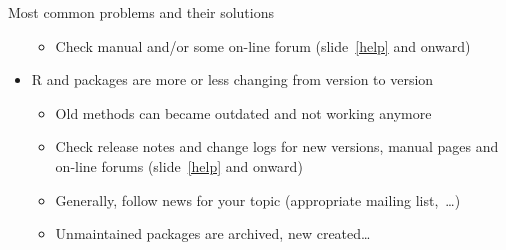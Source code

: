 \documentclass[compress, ucs, xelatex, 11pt, xcolor=svgnames, aspectratio=169,
	hyperref={
		bookmarks=true,
		unicode=true,
		colorlinks=true,
		pdftitle={Molecular data in R},
		plainpages=false,
		pdfauthor={Vojtech Zeisek},
		pdfsubject={Course about phylogeny and evolution in R},
		pdfcreator={XeLaTeX},
		pdfkeywords={R, evolution, phylogeny, molecular data},
		linkcolor=Crimson, %
		anchorcolor=Magenta, %
		citecolor=Magenta, %
		filecolor=Magenta, %
		menucolor=Magenta, %
		urlcolor=DodgerBlue, %
		pdftex},
	url={hyphens, lowtilde} %
	]{beamer}
\begin{document}
\begin{frame}[allowframebreaks]{Most common problems and their solutions}
\begin{itemize}
		\begin{itemize}
			\item Check manual and/or some on-line forum (slide~\ref{help} and onward)
		\end{itemize}
		\item R and packages are more or less changing from version to version
		\begin{itemize}
			\item Old methods can became outdated and not working anymore
			\item Check release notes and change logs for new versions, manual pages and on-line forums (slide~\ref{help} and onward)
			\item Generally, follow news for your topic (appropriate mailing list,~\ldots)
			\item Unmaintained packages are archived, new created\ldots
		\end{itemize}
	\end{itemize}
\end{frame}
\end{document}
